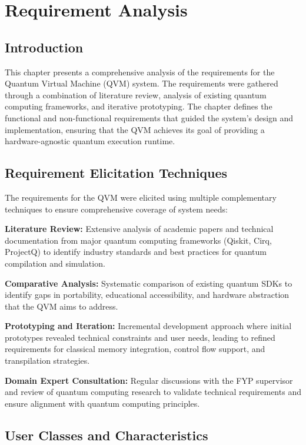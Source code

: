 \chapter{Requirement Analysis}

\section{Introduction}
This chapter presents a comprehensive analysis of the requirements for the Quantum Virtual Machine (QVM) system. The requirements were gathered through a combination of literature review, analysis of existing quantum computing frameworks, and iterative prototyping. The chapter defines the functional and non-functional requirements that guided the system's design and implementation, ensuring that the QVM achieves its goal of providing a hardware-agnostic quantum execution runtime.

\section{Requirement Elicitation Techniques}
The requirements for the QVM were elicited using multiple complementary techniques to ensure comprehensive coverage of system needs:

\textbf{Literature Review:} Extensive analysis of academic papers and technical documentation from major quantum computing frameworks (Qiskit, Cirq, ProjectQ) to identify industry standards and best practices for quantum compilation and simulation.

\textbf{Comparative Analysis:} Systematic comparison of existing quantum SDKs to identify gaps in portability, educational accessibility, and hardware abstraction that the QVM aims to address.

\textbf{Prototyping and Iteration:} Incremental development approach where initial prototypes revealed technical constraints and user needs, leading to refined requirements for classical memory integration, control flow support, and transpilation strategies.

\textbf{Domain Expert Consultation:} Regular discussions with the FYP supervisor and review of quantum computing research to validate technical requirements and ensure alignment with quantum computing principles.

\section{User Classes and Characteristics}


